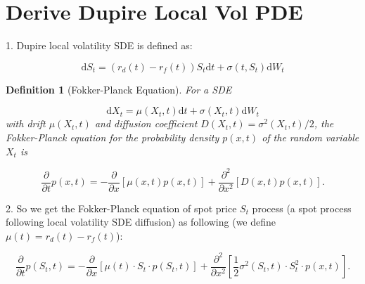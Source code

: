 \documentclass[12pt]{article}
\newtheorem{definition}{Definition}[section]
\begin{document}
\doublespacing


\section{Derive Dupire Local Vol PDE}
1. Dupire local volatility SDE is defined as: \par
\begin{equation}\label{eq:LocVolSDE}
    \mathrm{d}S_t = (r_d(t)-r_f(t))S_t\mathrm{d}t + \sigma(t,S_t)\mathrm{d}W_t
\end{equation}
\begin{definition}[Fokker-Planck Equation]
For a SDE \par
\begin{equation}
    \mathrm{d}X_t = \mu(X_t,t)\mathrm{d}t + \sigma(X_t,t)\mathrm{d}W_t
\end{equation}
with drift $\mu(X_t,t)$ and diffusion coefficient $D(X_t,t)=\sigma^2(X_t,t)/2$, the Fokker-Planck equation for the probability density $p(x,t)$ of the random variable $X_t$ is \par
\begin{equation}
    \frac{\partial}{\partial t}p(x,t) = -\frac{\partial}{\partial x}[\mu(x,t)p(x,t)]+\frac{\partial^2}{\partial x^2}[D(x,t)p(x,t)].
\end{equation}
\end{definition}

2. So we get the Fokker-Planck equation of spot price $S_t$ process (a spot process following local volatility SDE diffusion) as following (we define $\mu(t)=r_d(t)-r_f(t)$):\par
\begin{equation}
    \frac{\partial}{\partial t}p(S_t,t) = -\frac{\partial}{\partial x}\left[\mu(t)\cdot S_t\cdot p(S_t,t)\right]+\frac{\partial^2}{\partial x^2}\left[\frac{1}{2}\sigma^2(S_t,t)\cdot S^2_t\cdot p(x,t)\right].
\end{equation}
\end{document}
